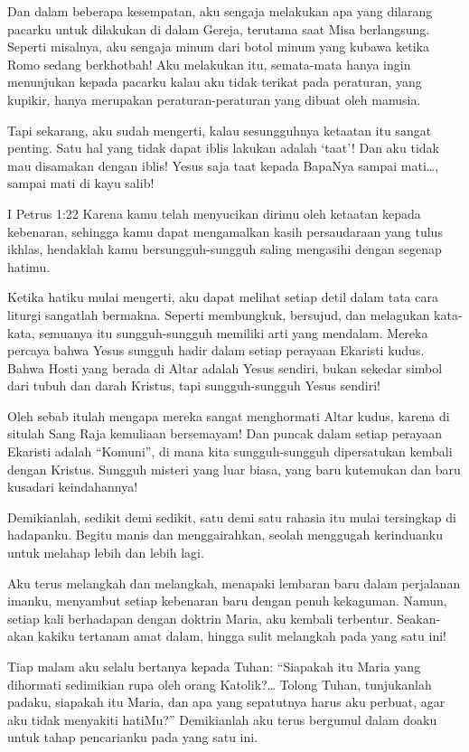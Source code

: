 Dan dalam beberapa kesempatan, aku sengaja melakukan apa yang dilarang pacarku untuk dilakukan di dalam Gereja, terutama saat Misa berlangsung. Seperti misalnya, aku sengaja minum dari botol minum yang kubawa ketika Romo sedang berkhotbah! Aku melakukan itu, semata-mata hanya ingin menunjukan kepada pacarku kalau aku tidak terikat pada peraturan, yang kupikir, hanya merupakan peraturan-peraturan yang dibuat oleh manusia.

Tapi sekarang, aku sudah mengerti, kalau sesungguhnya ketaatan itu sangat penting. Satu hal yang tidak dapat iblis lakukan adalah ‘taat’!
Dan aku tidak mau disamakan dengan iblis! Yesus saja taat kepada BapaNya sampai mati…, sampai mati di kayu salib!

I Petrus 1:22 Karena kamu telah menyucikan dirimu oleh ketaatan kepada kebenaran, sehingga kamu dapat mengamalkan kasih persaudaraan yang tulus ikhlas, hendaklah kamu bersungguh-sungguh saling mengasihi dengan segenap hatimu.

Ketika hatiku mulai mengerti, aku dapat melihat setiap detil dalam tata cara liturgi sangatlah bermakna. Seperti membungkuk, bersujud, dan melagukan kata-kata, semuanya itu sungguh-sungguh memiliki arti yang mendalam. Mereka percaya bahwa Yesus sungguh hadir dalam setiap perayaan Ekaristi kudus. Bahwa Hosti yang berada di Altar adalah Yesus sendiri, bukan sekedar simbol dari tubuh dan darah Kristus, tapi sungguh-sungguh Yesus sendiri!

Oleh sebab itulah mengapa mereka sangat menghormati Altar kudus, karena di situlah Sang Raja kemuliaan bersemayam! Dan puncak dalam setiap perayaan Ekaristi adalah “Komuni”, di mana kita sungguh-sungguh dipersatukan kembali dengan Kristus. Sungguh misteri yang luar biasa, yang baru kutemukan dan baru kusadari keindahannya!

Demikianlah, sedikit demi sedikit, satu demi satu rahasia itu mulai tersingkap di hadapanku. Begitu manis dan menggairahkan, seolah menggugah kerinduanku untuk melahap lebih dan lebih lagi.

Aku terus melangkah dan melangkah, menapaki lembaran baru dalam perjalanan imanku, menyambut setiap kebenaran baru dengan penuh kekaguman. Namun, setiap kali berhadapan dengan doktrin Maria, aku kembali terbentur. Seakan-akan kakiku tertanam amat dalam, hingga sulit melangkah pada yang satu ini!

Tiap malam aku selalu bertanya kepada Tuhan:
“Siapakah itu Maria yang dihormati sedimikian rupa oleh orang Katolik?… Tolong Tuhan, tunjukanlah padaku, siapakah itu Maria, dan apa yang sepatutnya harus aku perbuat, agar aku tidak menyakiti hatiMu?”
Demikianlah aku terus bergumul dalam doaku untuk tahap pencarianku pada yang satu ini.

